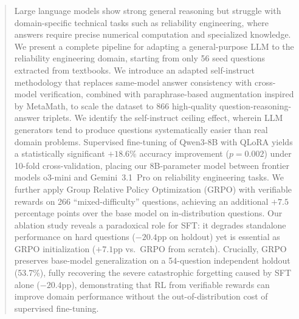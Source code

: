 \begin{abstract}
Large language models show strong general reasoning but struggle with domain-specific technical tasks such as reliability engineering, where answers require precise numerical computation and specialized knowledge. We present a complete pipeline for adapting a general-purpose LLM to the reliability engineering domain, starting from only 56 seed questions extracted from textbooks. We introduce an adapted self-instruct methodology that replaces same-model answer consistency with cross-model verification, combined with paraphrase-based augmentation inspired by MetaMath, to scale the dataset to 866 high-quality question-reasoning-answer triplets. We identify the self-instruct ceiling effect, wherein LLM generators tend to produce questions systematically easier than real domain problems. Supervised fine-tuning of Qwen3-8B with QLoRA yields a statistically significant $+18.6\%$ accuracy improvement ($p=0.002$) under 10-fold cross-validation, placing our 8B-parameter model between frontier models o3-mini and Gemini~3.1~Pro on reliability engineering tasks. We further apply Group Relative Policy Optimization (GRPO) with verifiable rewards on 266 ``mixed-difficulty'' questions, achieving an additional $+7.5$ percentage points over the base model on in-distribution questions. Our ablation study reveals a paradoxical role for SFT: it degrades standalone performance on hard questions ($-20.4$pp on holdout) yet is essential as GRPO initialization ($+7.1$pp vs.\ GRPO from scratch). Crucially, GRPO preserves base-model generalization on a 54-question independent holdout (53.7\%), fully recovering the severe catastrophic forgetting caused by SFT alone ($-20.4$pp), demonstrating that RL from verifiable rewards can improve domain performance without the out-of-distribution cost of supervised fine-tuning.

\end{abstract}
\renewcommand{\thefootnote}{\fnsymbol{footnote}}
\renewcommand{\thefootnote}{\arabic{footnote}}

